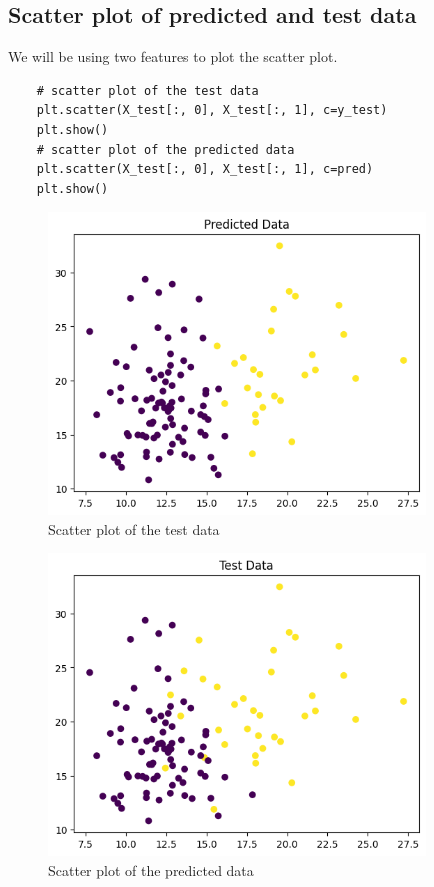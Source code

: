 \subsection{Scatter plot of predicted and test data}
We will be using two features to plot the scatter plot.
\begin{verbatim}
    # scatter plot of the test data
    plt.scatter(X_test[:, 0], X_test[:, 1], c=y_test)
    plt.show()
    # scatter plot of the predicted data
    plt.scatter(X_test[:, 0], X_test[:, 1], c=pred)
    plt.show()
\end{verbatim}
\begin{figure}[ht]
    \centering
    \includegraphics[width=10cm]{ch/figures/ch5.2.png}
    \caption{Scatter plot of the test data}
    \label{fig:scatter4}
\end{figure}
\begin{figure}[ht]
    \centering
    \includegraphics[width=10cm]{ch/figures/ch5.1.png}
    \caption{Scatter plot of the predicted data}
    \label{fig:scatter4}
\end{figure}
\newpage

